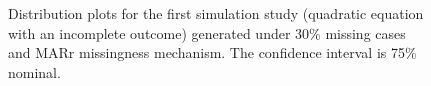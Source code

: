 	\begin{figure}[ht!]
		\begin{center}
		\end{center}
		\caption{Distribution plots for the first simulation study (quadratic equation with an incomplete outcome) generated under 30\% missing cases and MARr missingness mechanism. The confidence interval is 75\% nominal.}
		\label{fig6_4}
	\end{figure}
	
